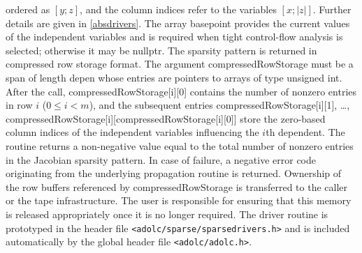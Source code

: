 \documentclass[11pt,twoside]{article}
\begin{document}
ordered as $[y;z]$, and the column indices refer to the variables
$[x;|z|]$. Further details are given in \autoref{absdrivers}.
%
The array {\sf basepoint} provides the current values of the independent
variables and is required when tight control-flow analysis is selected;
otherwise it may be {\sf nullptr}.
%
The sparsity pattern is returned in compressed row storage format. The
argument {\sf compressedRowStorage} must be a span of length {\sf depen}
whose entries are pointers to arrays of type {\sf unsigned int}.  After
the call, {\sf compressedRowStorage[i][0]} contains the number of nonzero
entries in row $i$
($0 \le i < m$), and the subsequent entries
{\sf compressedRowStorage[i][1]}, \ldots,
{\sf compressedRowStorage[i][compressedRowStorage[i][0]]} store the
zero-based column indices of the independent variables influencing the
$i$th dependent.
%
The routine returns a non-negative value equal to the total number of
nonzero entries in the Jacobian sparsity pattern.  In case of failure, a
negative error code originating from the underlying propagation routine
is returned.
%
Ownership of the row buffers referenced by {\sf compressedRowStorage} is
transferred to the caller or the tape infrastructure.  The user is
responsible for ensuring that this memory is released appropriately once
it is no longer required.
%
The driver routine is prototyped in the header file
\verb=<adolc/sparse/sparsedrivers.h>= and is included automatically by
the global header file \verb=<adolc/adolc.h>=.
\end{document}

